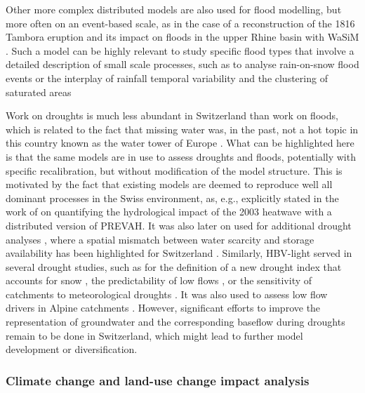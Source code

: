 \documentclass[10pt,a4paper]{article}
\begin{document}
Other more complex distributed models are also used for flood modelling, but more often on an event-based scale, as in the case of a reconstruction of the 1816 Tambora eruption and its impact on floods in the upper Rhine basin with WaSiM \citep[see Fig. \ref{fig:map};][]{Rossler2018}. Such a model can be highly relevant to study specific flood types that involve a detailed description of small scale processes, such as to analyse  rain-on-snow flood events \citep[][with WaSiM]{Rossler2014} or the interplay of rainfall temporal variability and the clustering of saturated areas \citep[][with TOPKAPI-ETH]{Paschalis2014}

Work on droughts is much less abundant in Switzerland than work on floods, which is related to the fact that missing water was, in the past, not a hot topic in this country known as the water tower of Europe \citep{Milano2015}. What can be highlighted here is that the same models are in use to assess droughts and floods, potentially with specific recalibration, but without modification of the model structure. This is motivated by the fact that existing models are deemed to reproduce well all dominant processes in the Swiss environment, as, e.g., explicitly stated in the work of \citet{Zappa2007a} on quantifying the hydrological impact of the 2003 heatwave with a distributed version of PREVAH. It was also later on used for additional drought analyses \citep{Brunner2019e, Zappa2019}, where a spatial mismatch between water scarcity and storage availability has been highlighted for Switzerland \citep{Brunner2019e}. 
Similarly, HBV-light served in several drought studies, such as for the definition of a new drought index that accounts for snow \citep{Staudinger2014}, the predictability of low flows \citep{Staudinger2014a}, or the sensitivity of catchments to meteorological droughts \citep{Staudinger2015}. It was also used to assess low flow drivers in Alpine catchments \citep{Arnoux2020}. However, significant efforts to improve the representation of groundwater and the corresponding baseflow during droughts remain to be done in Switzerland, which might lead to further model development or diversification.


\subsubsection{Climate change and land-use change impact analysis}
\label{sec:context:climatechange}
\end{document}
